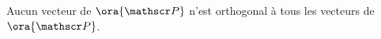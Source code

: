 Aucun vecteur de $\ora {\mathscr P}$ n'est orthogonal à tous les vecteurs de $\ora {\mathscr P}$.

\begin{reponses}
\end{reponses}

